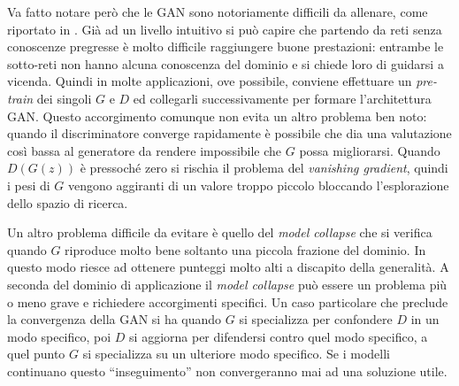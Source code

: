 Va fatto notare però che le GAN sono notoriamente difficili da allenare, come riportato in \cite{HARD_GAN}.
Già ad un livello intuitivo si può capire che partendo da reti senza conoscenze pregresse è molto difficile raggiungere buone prestazioni: entrambe le sotto-reti non hanno alcuna conoscenza del dominio e si chiede loro di guidarsi a vicenda.
Quindi in molte applicazioni, ove possibile, conviene effettuare un \emph{pre-train} dei singoli $G$ e $D$ ed collegarli successivamente per formare l'architettura GAN.
Questo accorgimento comunque non evita un altro problema ben noto: quando il discriminatore converge rapidamente è possibile che dia una valutazione così bassa al generatore da rendere impossibile che $G$ possa migliorarsi.
Quando $D(G(z))$ è pressoché zero si rischia il problema del \emph{vanishing gradient}, quindi i pesi di $G$ vengono aggiranti di un valore troppo piccolo bloccando l'esplorazione dello spazio di ricerca.

Un altro problema difficile da evitare è quello del \emph{model collapse} che si verifica quando $G$ riproduce molto bene soltanto una piccola frazione del dominio.
In questo modo riesce ad ottenere punteggi molto alti a discapito della generalità.
A seconda del dominio di applicazione il \emph{model collapse} può essere un problema più o meno grave e richiedere accorgimenti specifici.
Un caso particolare che preclude la convergenza della GAN si ha quando $G$ si specializza per confondere $D$ in un modo specifico, poi $D$ si aggiorna per difendersi contro quel modo specifico, a quel punto $G$ si specializza su un ulteriore modo specifico.
Se i modelli continuano questo ``inseguimento'' non convergeranno mai ad una soluzione utile.






